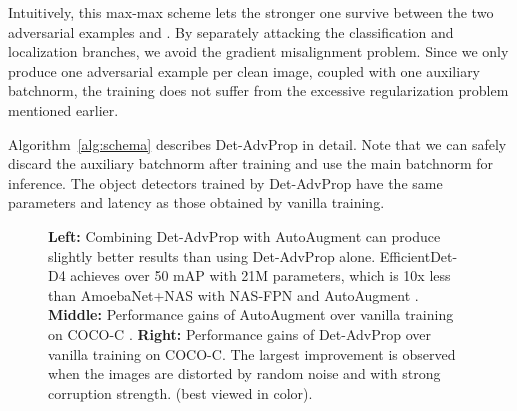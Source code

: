 \documentclass[final]{cvpr}
\begin{document}
Intuitively, this max-max scheme lets the stronger one survive between the two  adversarial examples  and .  By separately attacking the classification and localization branches, we avoid the gradient misalignment problem.
Since we only produce one adversarial example per clean image, coupled with one auxiliary batchnorm, the training does not suffer from the excessive regularization problem mentioned earlier.


Algorithm~\ref{alg:schema} describes Det-AdvProp in detail.
Note that we can safely discard the auxiliary batchnorm after training and use the main batchnorm for inference. The object detectors trained by Det-AdvProp have the same parameters and latency as those obtained by vanilla training.

































\begin{figure*}[!htb]
\centering
{}
\caption{\textbf{Left:} Combining Det-AdvProp with AutoAugment \cite{zoph2019learning} can produce slightly better results than using Det-AdvProp alone.
EfficientDet-D4 achieves over 50 mAP with 21M parameters, which is 10x less than AmoebaNet+NAS with NAS-FPN \cite{ghiasi2019nasfpn} and AutoAugment \cite{zoph2019learning}.
\textbf{Middle:} Performance gains of AutoAugment over vanilla training on COCO-C \cite{michaelis2020benchmarking}.
\textbf{Right:} Performance gains of Det-AdvProp over vanilla training on COCO-C. The largest improvement is observed when the images are distorted by random noise and with strong corruption strength.
(best viewed in color).}
\vspace{-12pt}
\end{figure*}
\end{document}

